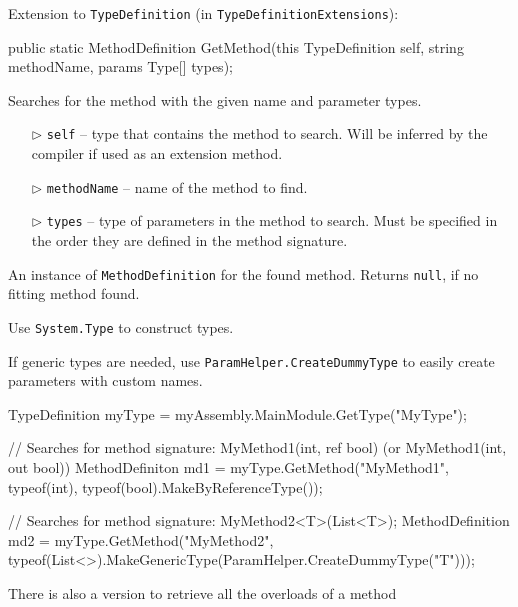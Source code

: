 \documentclass[a4paper,11pt]{article}
\begin{document}
\begin{mdef}
Extension to \texttt{TypeDefinition} (in \texttt{TypeDefinitionExtensions}):
\begin{cs}
public static MethodDefinition GetMethod(this TypeDefinition self, 
                                         string methodName, 
                                         params Type[] types);
\end{cs}
Searches for the method with the given name and parameter types.

\begin{itemize}
\item[$\triangleright$] \texttt{self} -- type that contains the method to search. Will be inferred by the compiler if used as an extension method.
\item[$\triangleright$] \texttt{methodName} -- name of the method to find.
\item[$\triangleright$] \texttt{types} -- type of parameters in the method to search. Must be specified in the order they are defined in the method signature.
\end{itemize}

An instance of \texttt{MethodDefinition} for the found method. Returns \texttt{null}, if no fitting method found.

Use \texttt{System.Type} to construct types. 
\newline

If generic types are needed, use \texttt{ParamHelper.CreateDummyType} to easily create parameters with custom names.

\begin{cs}
TypeDefinition myType = myAssembly.MainModule.GetType("MyType");

// Searches for method signature: MyMethod1(int, ref bool) (or MyMethod1(int, out bool))
MethodDefiniton md1 = myType.GetMethod("MyMethod1", 
                            typeof(int), 
                            typeof(bool).MakeByReferenceType());

// Searches for method signature: MyMethod2<T>(List<T>);
MethodDefinition md2 = 
  myType.GetMethod("MyMethod2", 
     typeof(List<>).MakeGenericType(ParamHelper.CreateDummyType("T")));
\end{cs}
\end{mdef}
\newpage
There is also a version to retrieve all the overloads of a method
\end{document}
